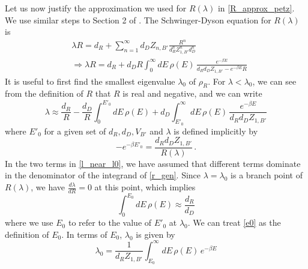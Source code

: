 \documentclass[a4paper,11pt]{article}
\newcommand{\be}{\begin{equation}}
\newcommand{\ee}{\end{equation}}
\begin{document}
\begin{enumerate}
\begin{appendix}
Let us now justify the approximation we used for $R(\lambda)$ in \eqref{R_approx_petz}. We use similar steps to Section 2 of \cite{2019arXiv191111977P}. The Schwinger-Dyson equation for $R(\lambda)$ is 
\begin{align} 
&\lambda R = d_R + \sum_{n=1}^{\infty} d_D Z_{n, B'} \frac{R^n}{d_R^n Z_{1, B'}^n d_D^n} \\
& \Rightarrow \lambda R = d_R + d_D R \int_0^{\infty} dE\, \rho(E)\, \frac{e^{-\beta E} }{d_R d_D Z_{1, B'} - e^{-\beta E} R} \label{r_gen}
\end{align}
 It is useful to first find the smallest eigenvalue $\lambda_0$ of $\rho_R$. For $\lambda< \lambda_0$, we can see from the definition of $R$ that $R$ is real and negative, and we can write 
\be 
\lambda \approx \frac{d_R}{R} - \frac{d_D}{R} \int_0^{E'_0} dE\, \rho(E) + d_D \int_{E'_0}^{\infty} dE\, \rho(E)\, \frac{e^{-\beta E} }{d_R d_D Z_{1, B'} } \label{l_near_l0}
\ee
where $E'_0$ for a given set of $d_R, d_D,V_{B'}$ and $\lambda$ is defined implicitly by 
\be 
- e^{-\beta E'_0} = \frac{d_R d_D Z_{1, B'}}{R(\lambda)} \, . 
\ee
In the two terms in \eqref{l_near_l0}, we have assumed that different terms dominate in the denominator of the integrand of \eqref{r_gen}. 
Since $\lambda =\lambda_0$ is a branch point of $R(\lambda)$, we have $\frac{d\lambda}{dR}=0$ at this point, which implies 
\be 
\int_0^{E_0} dE\, \rho(E) \approx \frac{d_R}{d_D} \label{e0_2}
\ee 
where we use $E_0$ to refer to the value of $E'_0$ at $\lambda_0$. We can treat \eqref{e0} as the definition of $E_0$. In terms of $E_0$, $\lambda_0$ is given by 
\be 
\lambda_0 =  \frac{1}{d_R Z_{1, B'}}\int_{E_0}^{\infty} dE \, \rho(E)\, e^{-\beta E} \label{lambda0_2}
\ee


\end{appendix}
\end{enumerate}
\end{document}
